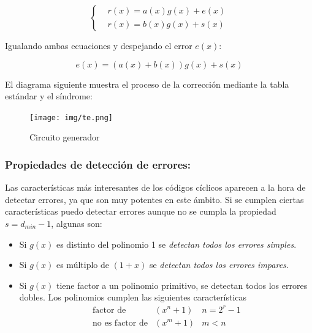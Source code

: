 \documentclass{article}
\begin{document}
\begin{equation}
    \left\{
        \begin{aligned}
            &r(x) = a(x)g(x) + e(x) \\
            &r(x) = b(x)g(x) + s(x)
        \end{aligned}
    \right.
\end{equation}

Igualando ambas ecuaciones y despejando el error $e(x)$:

\begin{equation}
    e(x) = (a(x) + b(x))g(x) + s(x)
\end{equation}

El diagrama siguiente muestra el proceso de la corrección mediante la tabla estándar y el síndrome:

\begin{figure}[h]
    \texttt{[image: img/te.png]}
    \caption{Circuito generador}
\end{figure}

\subsubsection{Propiedades de detección de errores:}

Las características más interesantes de los códigos cíclicos aparecen a la hora de detectar errores, ya que son muy potentes en este ámbito. Si se cumplen ciertas características puedo detectar errores aunque no se cumpla la propiedad $s = d_{min} - 1$, algunas son:

\begin{itemize}
    \item Si $g(x)$ es distinto del polinomio 1 se \textit{detectan todos los errores simples}.
    \item Si $g(x)$ es múltiplo de $(1+x)$ se \textit{detectan todos los errores impares}. 
    \item Si $g(x)$ tiene factor a un polinomio primitivo, se detectan todos los errores dobles. Los polinomios cumplen las siguientes características
    \begin{equation}
        \begin{array}{ccc}
            \text{factor de} & (x^n+1) & n=2^r-1\\
            \text{no es factor de} & (x^m+1) & m<n
        \end{array}
    \end{equation}
\end{itemize}
\end{document}
